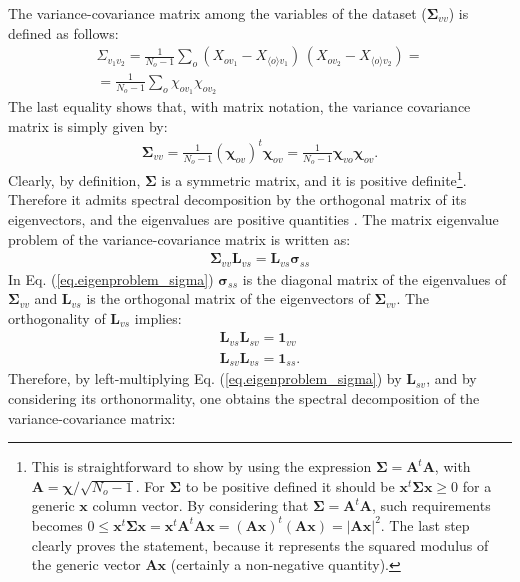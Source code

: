 \documentclass[11pt]{amsart}
\begin{document}
%
The variance-covariance matrix among the variables of the dataset ($\bm \Sigma_{vv}$) is defined as follows:
%
\begin{eqnarray}
\label{eq.variance_covariance}
\Sigma_{v_1 v_2} = 
\frac{1}{N_o-1} 
\sum_{o} 
\left( X_{o v_1} - X_{\langle o \rangle v_1} \right) 
\, 
\left( X_{o v_2} - X_{\langle o \rangle v_2} \right) 
=
\\ \nonumber
=
\frac{1}{N_o-1} 
\sum_{o}
\chi_{o v_1} \chi_{o v_2}
\end{eqnarray}
%
The last equality shows that, with matrix notation, the variance covariance matrix is simply given by:
%
\begin{eqnarray}
\label{eq.variance_covariance2}
\bm \Sigma_{vv} = 
\frac{1}{N_o-1} 
({\bm \chi_{ov}})^t {\bm \chi_{ov}} = \frac{1}{N_o-1} 
{\bm \chi_{vo}} {\bm \chi_{ov}}.
\end{eqnarray}
%
Clearly, by definition, $\bm \Sigma$ is a symmetric matrix, and it is positive definite\footnote{This is straightforward to show by using the expression $\bm \Sigma = \bm A^t \bm A$, with $\bm A = \bm \chi / \sqrt{N_o-1}$. For $\bm \Sigma$ to be positive defined it should be $\bm x^t \bm \Sigma \bm x \ge 0$ for a generic $\bm x$ column vector.
%
By considering that $\bm \Sigma = \bm A^t \bm A$, such requirements becomes $0 \le \bm x^t \bm \Sigma \bm x = \bm x^t \bm A^t \bm A \bm x = (\bm A \bm x)^t (\bm A \bm x) = \left| \bm A \bm x \right|^2$. The last step clearly proves the statement, because it represents the squared modulus of the generic vector $\bm A \bm x$ (certainly a non-negative quantity).}. Therefore it admits spectral decomposition by the orthogonal matrix of its eigenvectors, and the eigenvalues are positive quantities \cite{Schott2016}.
%
The matrix eigenvalue problem of the variance-covariance matrix is written as:
%
\begin{eqnarray}
\label{eq.eigenproblem_sigma}
\bm \Sigma_{vv} \bm L_{vs} = \bm L_{vs} \bm \sigma_{ss} 
\end{eqnarray}
%
In Eq. (\ref{eq.eigenproblem_sigma}) $\bm \sigma_{ss}$ is the diagonal matrix of the eigenvalues of $\bm \Sigma_{vv}$ and $\bm L_{vs}$ is the orthogonal matrix of the eigenvectors of $\bm \Sigma_{vv}$. The orthogonality of $\bm L_{vs}$ implies:
%
\begin{eqnarray}
\bm L_{vs} \bm L_{sv}  = \bm 1_{vv}
\\ \nonumber
\bm L_{sv} \bm L_{vs}  = \bm 1_{ss}. 
\end{eqnarray}
%
Therefore, by left-multiplying Eq. (\ref{eq.eigenproblem_sigma}) by $\bm L_{sv}$, and by considering its orthonormality, one obtains the spectral decomposition of the variance-covariance matrix:
\end{document}
